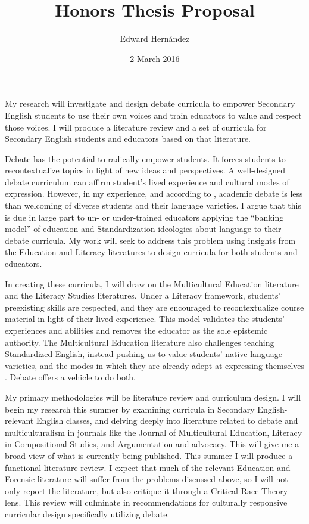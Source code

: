 \documentclass[man,12pt,natbib]{apa6}
\begin{document}
\title{Honors Thesis Proposal}
\author{Edward Hern\'{a}ndez}
\date{2 March 2016}
\maketitle

My research will investigate and design debate curricula to empower Secondary
English students to use their own voices and train educators to value and
respect those voices. I will produce a literature review and a set of curricula
for Secondary English students and educators based on that literature.

Debate has the potential to radically empower students. It forces students to
recontextualize topics in light of new ideas and perspectives. A well-designed
debate curriculum can affirm student’s lived experience and cultural modes of
expression. However, in my experience, and according to \citet{Polson12},
academic debate is less than welcoming of diverse students and their language
varieties. I argue that this is due in large part to un- or under-trained
educators applying the ``banking model'' of education \citep{Friere68} and
Standardization ideologies about language \citep{LippiGreen11} to their debate
curricula. My work will seek to address this problem using insights from the
Education and Literacy literatures to design curricula for both students and
educators.

In creating these curricula, I will draw on the Multicultural Education
\citep{Banks93,Banks15} literature and the Literacy Studies
\citep{Street08,Street12} literatures. Under a Literacy framework, students'
preexisting skills are respected, and they are encouraged to recontextualize
course material in light of their lived experience. This model validates the
students’ experiences and abilities and removes the educator as the sole
epistemic authority. The Multicultural Education literature also challenges
teaching Standardized English, instead pushing us to value students’ native
language varieties, and the modes in which they are already adept at expressing
themselves \citep{NCTE}. Debate offers a vehicle to do both.

My primary methodologies will be literature review and curriculum design. I
will begin my research this summer by examining curricula in Secondary
English-relevant English classes, and delving deeply into literature related to
debate and multiculturalism in journals like the Journal of Multicultural
Education, Literacy in Compositional Studies, and Argumentation and advocacy.
This will give me a broad view of what is currently being published. This
summer I will produce a functional literature review. I expect that much of the
relevant Education and Forensic literature will suffer from the problems
discussed above, so I will not only report the literature, but also critique it
through a Critical Race Theory lens. This review will culminate in
recommendations for culturally responsive curricular design specifically
utilizing debate.
\end{document}
